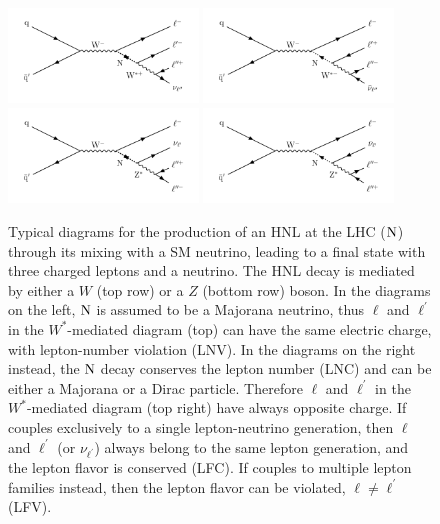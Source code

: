 \begin{figure}
\centering
\includegraphics[width=0.45\textwidth]{Figures/c3/hnl_feyn.pdf}
\includegraphics[width=0.45\textwidth]{Figures/c3/hnl_feyn_2.pdf}\\
\includegraphics[width=0.45\textwidth]{Figures/c3/hnl_z_feyn.pdf}
\includegraphics[width=0.45\textwidth]{Figures/c3/hnl_z_feyn_2.pdf}
\caption{Typical diagrams for the production of an HNL at the LHC 
($\mathrm{N}$) through its mixing with a SM neutrino, leading to a
final state with three charged leptons and a neutrino.
The HNL decay is mediated by either a $W$ (top row) or a $Z$ (bottom
row) boson.
In the diagrams on the left, $\mathrm{N}$ is assumed to be a Majorana
neutrino, thus $\ell$ and $\ell^\prime$ in the $W^\ast$-mediated
diagram (top) can have the same electric charge, with lepton-number
violation (LNV).
In the diagrams on the right instead, the $\mathrm{N}$ decay conserves the
lepton number (LNC) and can be either a Majorana or a Dirac
particle. Therefore $\ell$ and $\ell^\prime$ in the
$W^\ast$-mediated diagram (top right) have always opposite charge.
If \hnl couples exclusively to a single lepton-neutrino generation,
then $\ell$ and $\ell^\prime$ (or $\nu_{\ell^{\prime}}$) always belong
to the same lepton generation, and the lepton flavor is conserved
(LFC). If \hnl couples to multiple lepton families instead, then the
lepton flavor can be violated, $\ell\neq\ell^\prime$ (LFV).}
\label{fig:c3hnldiagram}
\end{figure}


